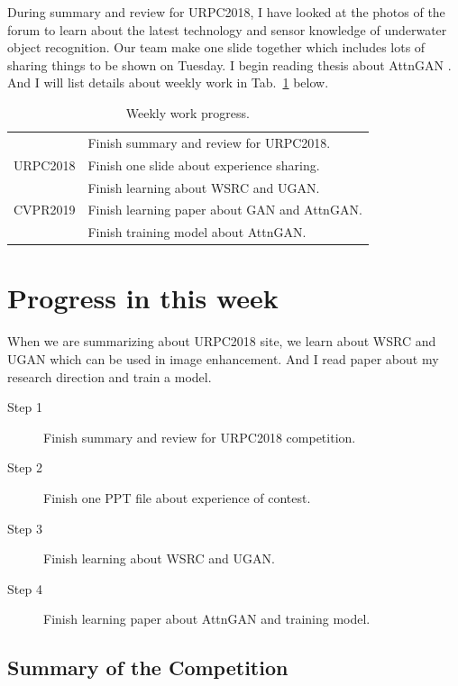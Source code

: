 \documentclass[a4paper]{article}
\begin{document}
	During summary and review for URPC2018, I have looked at the photos of the forum to learn about the latest technology and sensor knowledge of underwater object recognition. Our team make one slide together which includes lots of sharing things to be shown on Tuesday. I begin reading thesis about AttnGAN \cite{Tao18attngan}. And I will list details about weekly work in Tab.~\ref{t1} below.

	\begin{table}[hb]
		\centering
		\caption{Weekly work progress.}
		\begin{tabular}{c|p{10cm}}
			\hline 
			& Finish summary and review for URPC2018.\\
			URPC2018& Finish one slide about experience sharing. \\
			& Finish learning about WSRC and UGAN.\\
			\hline
			CVPR2019& Finish learning paper about GAN and AttnGAN.\\
			& Finish training model about AttnGAN.\\
			\hline
		\end{tabular}
		\label{t1}
	\end{table} 
	
	\section{Progress in this week}
	
	When we are summarizing about URPC2018 site, we learn about WSRC and UGAN which can be used in image enhancement. And I read paper about my research direction and train a model.
	\begin{description}
		\item[Step 1] Finish summary and review for URPC2018 competition.\\
		\item[Step 2] Finish one PPT file about experience of contest. \\
		\item[Step 3] Finish learning about WSRC and UGAN.\\
		\item[Step 4] Finish learning paper about AttnGAN and training model.\label{t2}
	\end{description}
	
	\subsection{Summary of the Competition}
	
\end{document}
